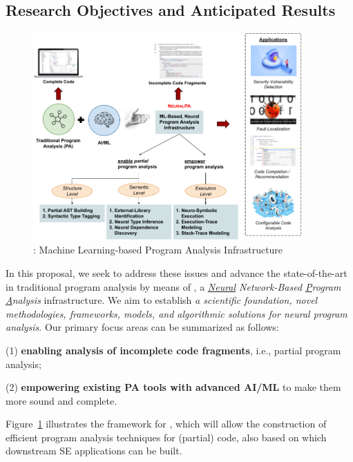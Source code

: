 \subsection{Research Objectives and Anticipated Results}

\begin{figure}[t]
    \centering
    \includegraphics[width=0.92\textwidth]{figures/infra-design-3.png}
    \caption{{\tool}: Machine Learning-based Program Analysis Infrastructure}
    \label{fig:arch}
\end{figure}


In this proposal, we seek to address these issues and advance the state-of-the-art in traditional program analysis by means of {\tool}, a {\em \underline{Neural} Network-Based \underline{P}rogram \underline{A}nalysis} infrastructure. We aim to establish {\em a scientific foundation, novel methodologies, frameworks, models, and algorithmic solutions for neural program analysis}. Our primary focus areas can be summarized as follows: 

(1) {\bf enabling analysis of incomplete code fragments}, i.e., partial program analysis;

(2) {\bf empowering existing PA tools with advanced AI/ML
} to make them more sound and complete.

\noindent Figure~\ref{fig:arch} illustrates the 
framework for {\tool}, which will allow the construction of efficient program analysis techniques for (partial) code, also based on which downstream 
SE applications can be built.


